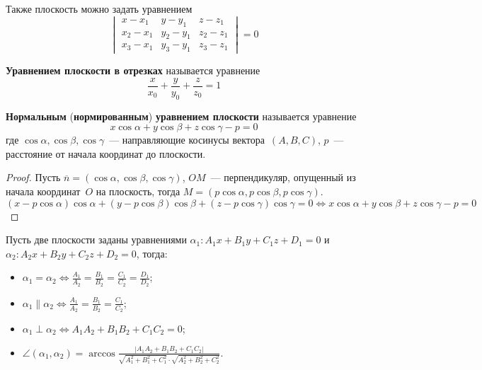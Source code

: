 Также плоскость можно задать уравнением
\begin{equation*}
\begin{vmatrix}
x - x_1 & y - y_1 & z - z_1 \\
x_2 - x_1 & y_2 - y_1 & z_2 - z_1 \\
x_3 - x_1 & y_3 - y_1 & z_3 - z_1
\end{vmatrix} = 0
\end{equation*}

\textbf{Уравнением плоскости в отрезках} называется уравнение
\begin{equation*}
\frac{x}{x_0} + \frac{y}{y_0} + \frac{z}{z_0} = 1
\end{equation*}

\textbf{Нормальным} (\textbf{нормированным}) \textbf{уравнением плоскости} называется уравнение
\begin{equation*}
x \cos \alpha + y \cos \beta + z \cos \gamma - p = 0
\end{equation*}
где $\cos \alpha, \cos \beta, \cos \gamma$~--- направляющие косинусы вектора~$(A, B, C)$, $p$~--- расстояние от начала координат до плоскости.
\begin{proof}
Пусть $\overline n = (\cos \alpha, \cos \beta, \cos \gamma)$, $OM$~--- перпендикуляр, опущенный из начала координат~$O$ на плоскость, тогда $M = (p \cos \alpha, p \cos \beta, p \cos \gamma)$.
\begin{equation*}
(x - p \cos \alpha) \cos \alpha + (y - p \cos \beta) \cos \beta + (z - p \cos \gamma) \cos \gamma = 0 \Leftrightarrow
x \cos \alpha + y \cos \beta + z \cos \gamma - p = 0
\end{equation*}
\end{proof}

Пусть две плоскости заданы уравнениями $\alpha_1 \colon A_1 x + B_1 y + C_1 z + D_1 = 0$ и $\alpha_2 \colon A_2 x + B_2 y + C_2 z + D_2 = 0$, тогда:
\begin{itemize}
	\item $\displaystyle \alpha_1 = \alpha_2 \Leftrightarrow
	\frac{A_1}{A_2} = \frac{B_1}{B_2} = \frac{C_1}{C_2} = \frac{D_1}{D_2}$;
	\item $\displaystyle \alpha_1 \parallel \alpha_2 \Leftrightarrow
	\frac{A_1}{A_2} = \frac{B_1}{B_2} = \frac{C_1}{C_2}$;
	\item $\displaystyle \alpha_1 \perp \alpha_2 \Leftrightarrow
	A_1 A_2 + B_1 B_2 + C_1 C_2 = 0$;
	\item $\displaystyle \angle(\alpha_1, \alpha_2) = \arccos \frac{|A_1 A_2 + B_1 B_2 + C_1 C_2|}{\sqrt{A_1^2 + B_1^2 + C_1^2} \cdot \sqrt{A_2^2 + B_2^2 + C_2^2}}$.
\end{itemize}

